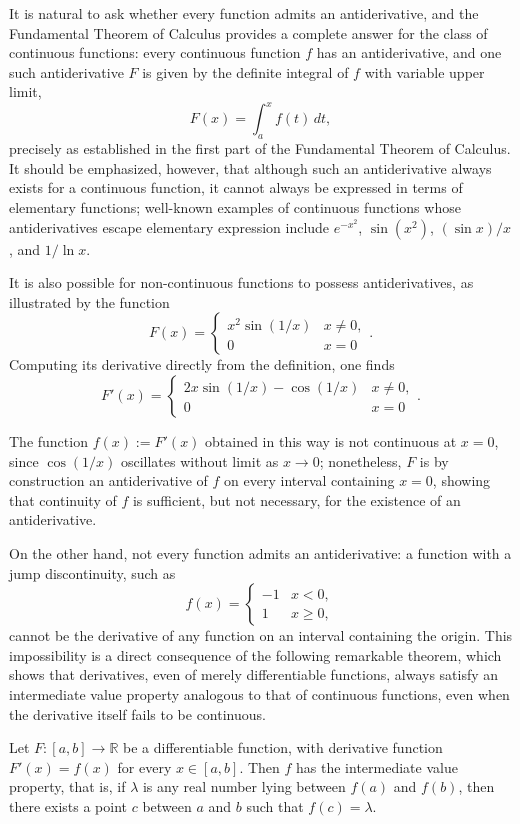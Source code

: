 It is natural to ask whether every function admits an antiderivative, and the Fundamental Theorem of Calculus provides a complete answer for the class of continuous functions: every continuous function $f$ has an antiderivative, and one such antiderivative $F$ is given by the definite integral of $f$ with variable upper limit, \[
F(x) = \int_a^x f(t) \, dt,
\] precisely as established in the first part of the Fundamental Theorem of Calculus. It should be emphasized, however, that although such an antiderivative always exists for a continuous function, it cannot always be expressed in terms of elementary functions; well-known examples of continuous functions whose antiderivatives escape elementary expression include $e^{-x^2}$, $\sin(x^2)$, $(\sin x)/x$, and $1/\ln x$.

It is also possible for non-continuous functions to possess antiderivatives, as illustrated by the function
\[
F(x) =
\begin{cases}
x^2 \sin(1/x) & x \neq 0, \\
0 & x = 0
\end{cases}.
\]
Computing its derivative directly from the definition, one finds
\[
F'(x) =
\begin{cases}
2x \sin(1/x) - \cos(1/x) & x \neq 0, \\
0 & x = 0
\end{cases}.
\]

The function $f(x) := F'(x)$ obtained in this way is not continuous at $x = 0$, since $\cos(1/x)$ oscillates without limit as $x \to 0$; nonetheless, $F$ is by construction an antiderivative of $f$ on every interval containing $x = 0$, showing that continuity of $f$ is sufficient, but not necessary, for the existence of an antiderivative.

On the other hand, not every function admits an antiderivative: a function with a jump discontinuity, such as
\[
f(x) =
\begin{cases}
-1 & x < 0, \\
1 & x \geq 0,
\end{cases}
\]
cannot be the derivative of any function on an interval containing the origin. This impossibility is a direct consequence of the following remarkable theorem, which shows that derivatives, even of merely differentiable functions, always satisfy an intermediate value property analogous to that of continuous functions, even when the derivative itself fails to be continuous.

\begin{theorem}
Let $F : [a,b] \to \mathbb{R}$ be a differentiable function, with derivative function $F'(x) = f(x)$ for every $x \in [a,b]$. Then $f$ has the intermediate value property, that is, if $\lambda$ is any real number lying between $f(a)$ and $f(b)$, then there exists a point $c$ between $a$ and $b$ such that $f(c) = \lambda$.
\end{theorem}

